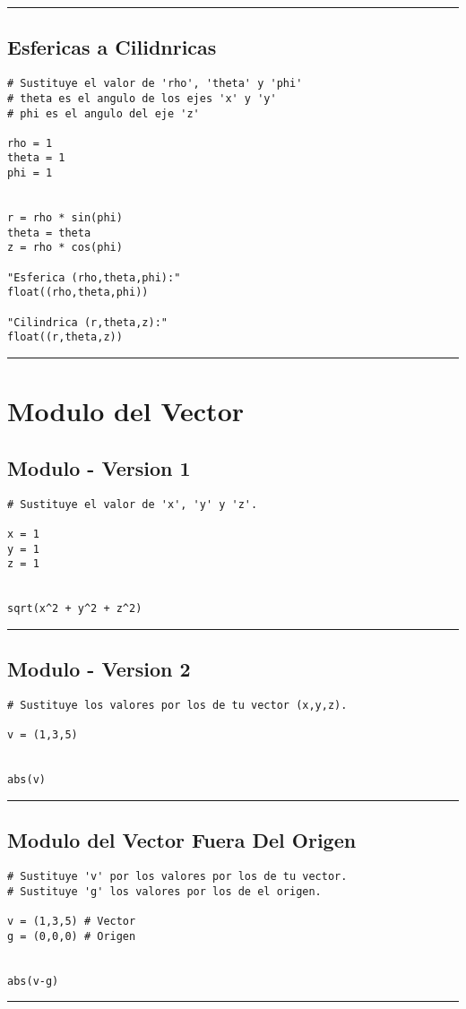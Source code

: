 \documentclass{article}
\begin{document}
\noindent\rule{\textwidth}{0.5pt}

\newpage 

\subsection{Esfericas a Cilidnricas}
\label{sec:orgb024d8d}
\begin{verbatim}
# Sustituye el valor de 'rho', 'theta' y 'phi'
# theta es el angulo de los ejes 'x' y 'y'
# phi es el angulo del eje 'z'

rho = 1
theta = 1
phi = 1


r = rho * sin(phi)
theta = theta
z = rho * cos(phi)

"Esferica (rho,theta,phi):"
float((rho,theta,phi))

"Cilindrica (r,theta,z):"
float((r,theta,z))
\end{verbatim}

\noindent\rule{\textwidth}{0.5pt}

\newpage

\section{Modulo del Vector}
\label{sec:org4c3fcdb}
\subsection{Modulo - Version 1}
\label{sec:orgbce2768}
\begin{verbatim}
# Sustituye el valor de 'x', 'y' y 'z'.

x = 1
y = 1
z = 1


sqrt(x^2 + y^2 + z^2)
\end{verbatim}

\noindent\rule{\textwidth}{0.5pt}

\subsection{Modulo - Version 2}
\label{sec:orgd8f5923}
\begin{verbatim}
# Sustituye los valores por los de tu vector (x,y,z).

v = (1,3,5)


abs(v)
\end{verbatim}

\noindent\rule{\textwidth}{0.5pt}

\subsection{Modulo del Vector Fuera Del Origen}
\label{sec:org9a3e4ea}
\begin{verbatim}
# Sustituye 'v' por los valores por los de tu vector.
# Sustituye 'g' los valores por los de el origen.

v = (1,3,5) # Vector
g = (0,0,0) # Origen


abs(v-g)
\end{verbatim}

\noindent\rule{\textwidth}{0.5pt}
\end{document}
